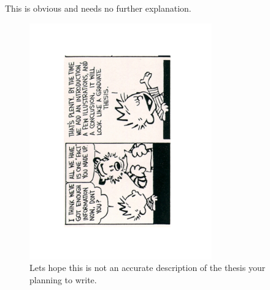 This is obvious and needs no further explanation.

\begin{figure}
\centering
\includegraphics[width=0.7\textwidth,angle=270]{chapter2/figures/CalvinAndHobbes_PhDThesis.pdf}
\caption{Lets hope this is not an accurate description of the thesis your planning to write.\label{fig:calvin}}
\end{figure} 

